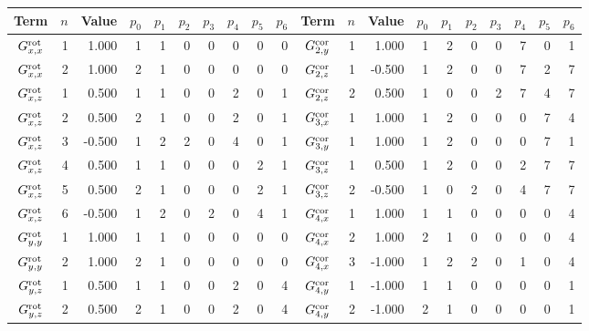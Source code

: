         \begin{tabular}{crrrrrrrrrcrrrrrrrrr}
            \hline
            \hline
                Term  & $n$ & Value & $p_0$ & $p_1$ & $p_2$ & $p_3$ & $p_4$ & $p_5$ & $p_6$ & Term  & $n$ & Value & $p_0$ & $p_1$ & $p_2$ & $p_3$ & $p_4$ & $p_5$ & $p_6$ \\
            \hline
$ G^{\rm rot}_{  x  ,x  }  $&     1  &  1.000 & 1 & 1 & 0 & 0 & 0 & 0 & 0 &     $    G^{\rm cor}_{2, y}  $&  1  &  1.000 & 1 & 2 & 0 & 0 & 7 & 0 & 1\\
$ G^{\rm rot}_{  x  ,x  }  $&     2  &  1.000 & 2 & 1 & 0 & 0 & 0 & 0 & 0 &     $    G^{\rm cor}_{2, z}  $&  1  & -0.500 & 1 & 2 & 0 & 0 & 7 & 2 & 7\\
$ G^{\rm rot}_{  x  ,z  }  $&     1  &  0.500 & 1 & 1 & 0 & 0 & 2 & 0 & 1 &     $    G^{\rm cor}_{2, z}  $&  2  &  0.500 & 1 & 0 & 0 & 2 & 7 & 4 & 7\\
$ G^{\rm rot}_{  x  ,z  }  $&     2  &  0.500 & 2 & 1 & 0 & 0 & 2 & 0 & 1 &     $    G^{\rm cor}_{3, x}  $&  1  &  1.000 & 1 & 2 & 0 & 0 & 0 & 7 & 4\\
$ G^{\rm rot}_{  x  ,z  }  $&     3  & -0.500 & 1 & 2 & 2 & 0 & 4 & 0 & 1 &     $    G^{\rm cor}_{3, y}  $&  1  &  1.000 & 1 & 2 & 0 & 0 & 0 & 7 & 1\\
$ G^{\rm rot}_{  x  ,z  }  $&     4  &  0.500 & 1 & 1 & 0 & 0 & 0 & 2 & 1 &     $    G^{\rm cor}_{3, z}  $&  1  &  0.500 & 1 & 2 & 0 & 0 & 2 & 7 & 7\\
$ G^{\rm rot}_{  x  ,z  }  $&     5  &  0.500 & 2 & 1 & 0 & 0 & 0 & 2 & 1 &     $    G^{\rm cor}_{3, z}  $&  2  & -0.500 & 1 & 0 & 2 & 0 & 4 & 7 & 7\\
$ G^{\rm rot}_{  x  ,z  }  $&     6  & -0.500 & 1 & 2 & 0 & 2 & 0 & 4 & 1 &     $    G^{\rm cor}_{4, x}  $&  1  &  1.000 & 1 & 1 & 0 & 0 & 0 & 0 & 4\\
$ G^{\rm rot}_{  y  ,y  }  $&     1  &  1.000 & 1 & 1 & 0 & 0 & 0 & 0 & 0 &     $    G^{\rm cor}_{4, x}  $&  2  &  1.000 & 2 & 1 & 0 & 0 & 0 & 0 & 4\\
$ G^{\rm rot}_{  y  ,y  }  $&     2  &  1.000 & 2 & 1 & 0 & 0 & 0 & 0 & 0 &     $    G^{\rm cor}_{4, x}  $&  3  & -1.000 & 1 & 2 & 2 & 0 & 1 & 0 & 4\\
$ G^{\rm rot}_{  y  ,z  }  $&     1  &  0.500 & 1 & 1 & 0 & 0 & 2 & 0 & 4 &     $    G^{\rm cor}_{4, y}  $&  1  & -1.000 & 1 & 1 & 0 & 0 & 0 & 0 & 1\\
$ G^{\rm rot}_{  y  ,z  }  $&     2  &  0.500 & 2 & 1 & 0 & 0 & 2 & 0 & 4 &     $    G^{\rm cor}_{4, y}  $&  2  & -1.000 & 2 & 1 & 0 & 0 & 0 & 0 & 1\\

\end{tabular}
